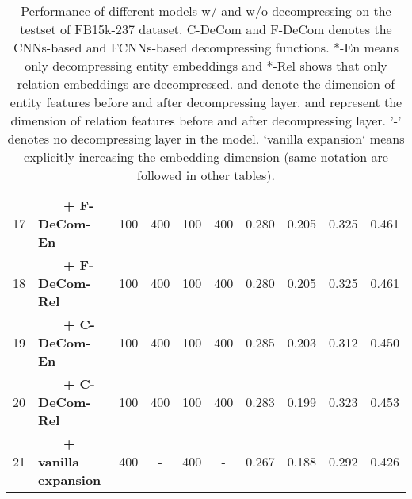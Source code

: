 \documentclass[letterpaper]{article} \usepackage{aaai20}  \usepackage{times}  \usepackage{helvet} \usepackage{courier}  \usepackage{booktabs}
\begin{document}
\begin{table*}[t]
\begin{tabular}{|c|l|cccc|cccc|}
         17 &~~~~\textbf{+ F-DeCom-En} & 100 & 400 & 100 & 400 & 0.280 & 0.205 & 0.325 & 0.461\\
         18 &~~~~\textbf{+ F-DeCom-Rel}& 100 & 400 & 100 & 400 & 0.280 & 0.205 & 0.325 & 0.461\\
         19 &~~~~\textbf{+ C-DeCom-En} & 100 & 400 & 100 & 400 & 0.285 & 0.203 & 0.312 & 0.450\\
         20 &~~~~\textbf{+ C-DeCom-Rel} & 100 & 400 & 100 & 400 &0.283 & 0,199 & 0.323 & 0.453 \\
         21 &~~~~\textbf{+ vanilla expansion} & 400 & - & 400 & - & 0.267 & 0.188 & 0.292 & 0.426\\
        \bottomrule 
    \end{tabular}
    \caption{Performance of different models w/ and w/o decompressing on the testset of FB15k-237 dataset. C-DeCom and F-DeCom denotes the CNNs-based and FCNNs-based decompressing functions. *-En means only decompressing entity embeddings and *-Rel shows that only relation embeddings are decompressed.  and  denote the dimension of entity features before and after decompressing layer.  and  represent the dimension of relation features before and after decompressing layer. '-' denotes no decompressing layer in the model. `vanilla expansion` means explicitly increasing the embedding dimension (same notation are followed in other tables).}
    \label{tab:main_fb15k237}
\end{table*}
\end{document}
